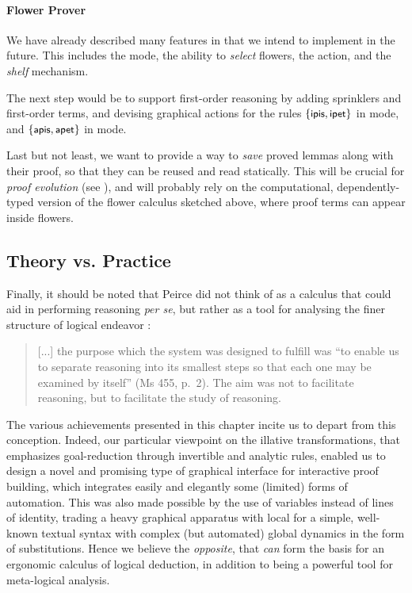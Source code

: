 \paragraph{Flower Prover}

We have already described many features in  that we
intend to implement in the future. This includes the \Navigation mode, the
ability to \emph{select} flowers, the  \Proof action, and the
\emph{shelf} mechanism.

The next step would be to support first-order reasoning by adding sprinklers and
first-order terms, and devising graphical actions for the rules $\{\text{\small$\mathsf{ipis}$},
\text{\small$\mathsf{ipet}$}\}$ in \Proof mode, and $\{\text{\small$\mathsf{apis}$}, \text{\small$\mathsf{apet}$}\}$ in \Edit mode.

Last but not least, we want to provide a way to \emph{save} proved lemmas along
with their proof, so that they can be reused and read statically. This will be
crucial for \emph{proof evolution} (see ), and will
probably rely on the computational, dependently-typed version of the flower
calculus sketched above, where proof terms can appear inside flowers.

\subsection{Theory vs. Practice}

Finally, it should be noted that Peirce did not think of  as a calculus that
could aid in performing reasoning \emph{per se}, but rather as a tool for
analysing the finer structure of logical endeavor
\cite[pp.~110--111]{Roberts+1973}:
\begin{quote}
  [...] the purpose which the system was designed to fulfill was ``to enable us
to separate reasoning into its smallest steps so that each one may be examined
by itself'' (Ms 455, p.~2). The aim was not to facilitate reasoning, but to
facilitate the study of reasoning.
\end{quote}

The various achievements presented in this chapter incite us to depart from this
conception. Indeed, our particular viewpoint on the illative transformations,
that emphasizes goal-reduction through invertible and analytic rules, enabled us
to design a novel and promising type of graphical interface for interactive
proof building, which integrates easily and elegantly some (limited) forms of
automation. This was also made possible by the use of variables instead of lines
of identity, trading a heavy graphical apparatus with local  for
a simple, well-known textual syntax with complex (but automated) global dynamics
in the form of substitutions. Hence we believe the \emph{opposite}, that 
\emph{can} form the basis for an ergonomic calculus of logical deduction, in
addition to being a powerful tool for meta-logical analysis.